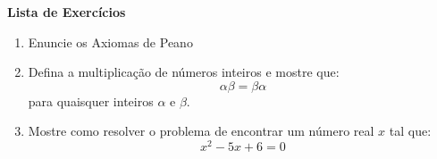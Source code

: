 \documentclass[12pt]{article}
\begin{document}
\textbf{Lista de Exercícios}

\begin{enumerate}
    \item Enuncie os Axiomas de Peano
    
    \item Defina a multiplicação de números inteiros e mostre que:
    \begin{equation}
        \alpha\beta=\beta\alpha
    \end{equation}
    para quaisquer inteiros $\alpha$ e $\beta$.
    
    \item Mostre como resolver o problema de encontrar um número real $x$ tal que:
    \begin{equation}
        x^2 - 5x + 6 = 0
    \end{equation}
\end{enumerate}
\end{document}
